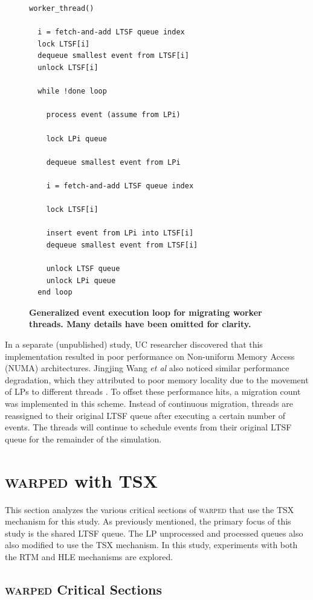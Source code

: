 \documentclass[11pt]{book}
\begin{document}
\begin{figure}
\begin{verbatim}
worker_thread()

  i = fetch-and-add LTSF queue index
  lock LTSF[i]
  dequeue smallest event from LTSF[i]
  unlock LTSF[i]

  while !done loop

    process event (assume from LPi)

    lock LPi queue
    
    dequeue smallest event from LPi

    i = fetch-and-add LTSF queue index

    lock LTSF[i]

    insert event from LPi into LTSF[i]
    dequeue smallest event from LTSF[i]

    unlock LTSF queue
    unlock LPi queue
  end loop
\end{verbatim}
\caption{\textbf{Generalized event execution loop for migrating worker threads.  Many
    details have been omitted for clarity.}}\label{migratinWorkerThreadAlgorithm}
\end{figure}

In a separate (unpublished) study, UC researcher discovered that this
implementation resulted in poor performance on Non-uniform Memory Access (NUMA)
architectures.  Jingjing Wang \emph{et al} also noticed similar performance
degradation, which they attributed to poor memory locality due to the movement
of LPs to different threads \cite{numa}.  To offset these performance hits, a
migration count was implemented in this scheme.  Instead of continuous
migration, threads are reassigned to their original LTSF queue after executing a
certain number of events.  The threads will continue to schedule events from
their original LTSF queue for the remainder of the simulation.

\chapter{\textsc{warped} with TSX}

This section analyzes the various critical sections of \textsc{warped} that use the TSX
mechanism for this study.  As previously mentioned, the primary focus of this study is the
shared LTSF queue.  The LP unprocessed and processed queues also also modified to use the
TSX mechanism.  In this study, experiments with both the RTM and HLE mechanisms are
explored. 

\section{\textsc{warped} Critical Sections}
\end{document}
